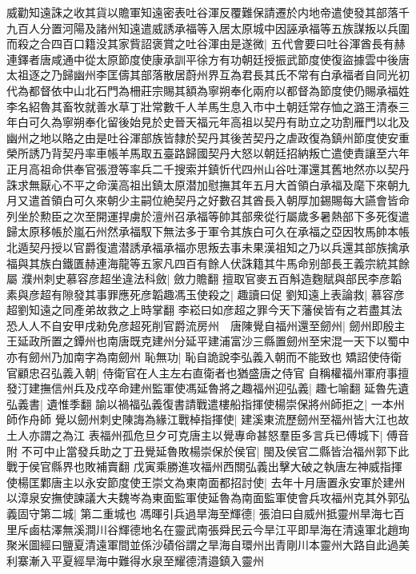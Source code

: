 威勸知遠誅之收其貨以贍軍知遠密表吐谷渾反覆難保請遷於内地帝遣使發其部落千九百人分置河陽及諸州知遠遣威誘承福等入居太原城中因誣承福等五族謀叛以兵圍而殺之合四百口籍没其家貲詔褒賞之吐谷渾由是遂微|{
	五代會要曰吐谷渾酋長有赫連鐸者唐咸通中從太原節度使康承訓平徐方有功朝廷授振武節度使復盜據雲中後唐太祖逐之乃歸幽州李匡儔其部落散居蔚州界互為君長其氏不常有白承福者自同光初代為都督依中山北石門為柵莊宗賜其額為寧朔奉化兩府以都督為節度使仍賜承福姓李名紹魯其畜牧就善水草丁壯常數千人羊馬生息入市中土朝廷常存恤之潞王清泰三年白可久為寧朔奉化留後始見於史晉天福元年高祖以契丹有助立之功割雁門以北及幽州之地以賂之由是吐谷渾部族皆隸於契丹其後苦契丹之虐政復為鎮州節度使安重榮所誘乃背契丹率車帳羊馬取五臺路歸國契丹大怒以朝廷招納叛亡遣使責讓至六年正月高祖命供奉官張澄等率兵二千搜索并鎮忻代四州山谷吐渾還其舊地然亦以契丹誅求無厭心不平之命漢高祖出鎮太原潜加慰撫其年五月大首領白承福及麾下來朝九月又遣首領白可久來朝少主嗣位絶契丹之好數召其酋長入朝厚加錫賜每大讌會皆命列坐於勲臣之次至開運捍虜於澶州召承福等帥其部衆從行屬歲多暑熱部下多死復遣歸太原移帳於嵐石州然承福馭下無法多于軍令其族白可久在承福之亞因牧馬帥本帳北遁契丹授以官爵復遣潜誘承福承福亦思叛去事未果漢祖知之乃以兵還其部族擒承福與其族白鐵匱赫連海龍等五家凡四百有餘人伏誅籍其牛馬命别部長王義宗統其餘屬}
濮州刺史慕容彦超坐違法科斂|{
	斂力贍翻}
擅取官麥五百斛造麴賦與部民李彦韜素與彦超有隙發其事罪應死彦韜趣馮玉使殺之|{
	趣讀曰促}
劉知遠上表論救|{
	慕容彦超劉知遠之同產弟故救之上時掌翻}
李崧曰如彦超之罪今天下藩侯皆有之若盡其法恐人人不自安甲戌勑免彦超死削官爵流房州　唐陳覺自福州還至劒州|{
	劒州即殷主王延政所置之鐔州也南唐既克建州分延平建浦富沙三縣置劒州至宋混一天下以蜀中亦有劒州乃加南字為南劒州}
恥無功|{
	恥自詭說李弘義入朝而不能致也}
矯詔使侍衛官顧忠召弘義入朝|{
	侍衛官在人主左右直衛者也猶盛唐之侍官}
自稱權福州軍府事擅發汀建撫信州兵及戍卒命建州監軍使馮延魯將之趣福州迎弘義|{
	趣七喻翻}
延魯先遺弘義書|{
	遺惟季翻}
諭以禍福弘義復書請戰遣樓船指揮使楊崇保將州師拒之|{
	一本州師作舟師}
覺以劒州刺史陳誨為緣江戰棹指揮使|{
	建溪東流歷劒州至福州皆大江也故土人亦謂之為江}
表福州孤危旦夕可克唐主以覺專命甚怒羣臣多言兵已傅城下|{
	傅音附}
不可中止當發兵助之丁丑覺延魯敗楊崇保於侯官|{
	閩及侯官二縣皆治福州郭下此戰于侯官縣界也敗補賣翻}
戊寅乘勝進攻福州西關弘義出擊大破之執唐左神威指揮使楊匡鄴唐主以永安節度使王崇文為東南面都招討使|{
	去年十月唐置永安軍於建州}
以漳泉安撫使諫議大夫魏岑為東面監軍使延魯為南面監軍使會兵攻福州克其外郭弘義固守第二城|{
	第二重城也}
馮暉引兵過旱海至輝德|{
	張洎曰自威州抵靈州旱海七百里斥鹵枯澤無溪澗川谷輝德地名在靈武南張舜民云今旱江平即旱海在清遠軍北趙珣聚米圖經曰鹽夏清遠軍間並係沙磧俗謂之旱海自環州出青剛川本靈州大路自此過美利寨漸入平夏經旱海中難得水泉至耀德清邉鎮入靈州}
